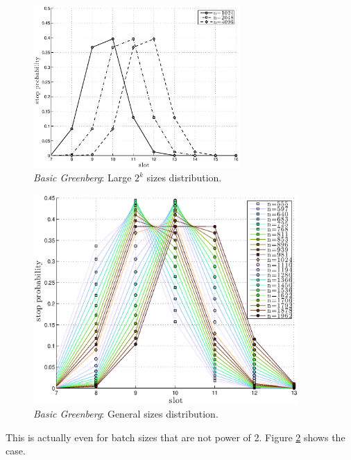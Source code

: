 \documentclass[11pt,a4paper,twoside,openright]{book}
\begin{document}
\begin{figure}[H]
\begin{center}
\includegraphics[width=0.7\textwidth]{matlab/Greenberg_stop_prob/greenberg-stop-distribution-uniformity}
\caption{\emph{Basic Greenberg}:  Large $2^{k}$ sizes distribution.}
\label{fig:greenberg-dist-large}
\end{center}
\end{figure}


\begin{figure}[H]
\begin{center}
\includegraphics[width=0.9\textwidth]{matlab/Greenberg_stop_prob/greenberg-stop-distribution-intermediate-values}
\caption{\emph{Basic Greenberg}:  General sizes distribution.}
\label{fig:greenberg-dist-general}
\end{center}
\end{figure}
This is actually even for batch sizes that are not power of 2. Figure \ref{fig:greenberg-dist-general} shows the case.
\end{document}
